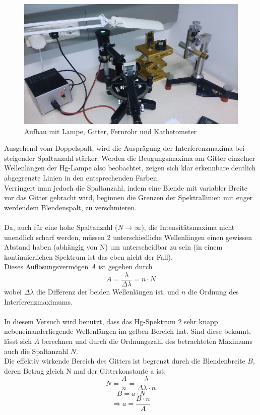 \documentclass[12pt,a4paper]{article}
\begin{document}
\begin{multicols}{2}
\begin{figure}[H]
	\centering
	\includegraphics[scale=0.11]{./data/Aufloesungsvermoegen/Aufloesungsvermoegen_Aufbau.jpg}
	\caption{Aufbau mit Lampe, Gitter, Fernrohr und Kathetometer}
	\label{fig:Skizze_Michelson}
\end{figure}



Ausgehend vom Doppelspalt, wird die Ausprägung der Interferenzmaxima bei steigender Spaltanzahl stärker. Werden die Beugungsmaxima am Gitter einzelner Wellenlängen der Hg-Lampe also beobachtet, zeigen sich klar erkennbare deutlich abgegrenzte Linien in den entsprechenden Farben.\\
Verringert man jedoch die Spaltanzahl, indem eine Blende mit variabler Breite vor das Gitter gebracht wird, beginnen die Grenzen der Spektrallinien mit enger werdendem Blendenspalt, zu verschmieren.\\
\\
Da, auch für eine hohe Spaltanzahl ($N \rightarrow \infty $), die Intensitätsmaxima nicht unendlich scharf werden, müssen 2 unterschiedliche Wellenlängen einen gewissen Abstand haben (abhängig von N) um unterscheidbar zu sein (in einem kontinuierlichen Spektrum ist das eben nicht der Fall).\\
Dieses Auflösungsvermögen $A$ ist gegeben durch
$$A= \frac{\lambda}{\Delta \lambda} = n \cdot N$$
wobei $\Delta \lambda$ die Differenz der beiden Wellenlängen ist, und $n$ die Ordnung des Interferenzmaximums.\\
\\
In diesem Versuch wird benutzt, dass das Hg-Spektrum 2 sehr knapp nebeneinanderliegende Wellenlängen im gelben Bereich hat. Sind diese bekannt, lässt sich $A$ berechnen und durch die Ordnungszahl des betrachteten Maximums auch die Spaltanzahl $N$.\\
Die effektiv wirkende Bereich des Gitters ist begrenzt durch die Blendenbreite $B$, deren Betrag gleich N mal der Gitterkonstante a ist: 
$$N=\frac {A}{n}= \frac{\lambda}{\Delta \lambda \cdot n}$$
$$B = a \cdot N$$
$$\Rightarrow a = \frac {B \cdot n}{A}$$


\end{multicols}
\end{document}
